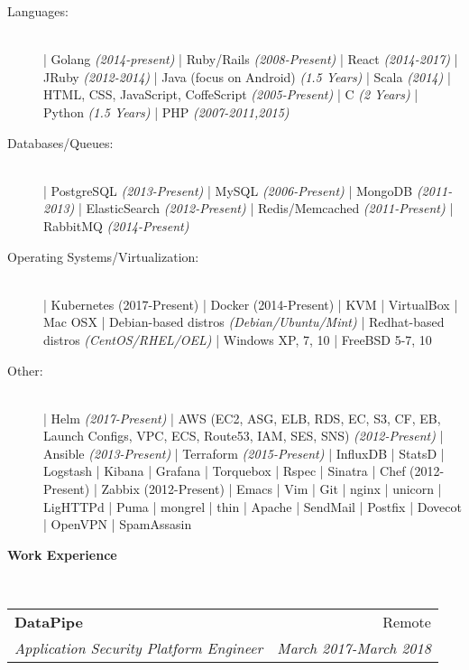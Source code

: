 \documentclass[a4paper,11pt,sans]{article}
\makeatletter
\newcommand{\resheading}[1]{{\large \colorbox{myblue}{\begin{minipage}{\textwidth}{\textbf{#1 \vphantom{p\^{E}}}}\end{minipage}}}}
\newcommand{\ressubheading}[4]{
\begin{tabular*}{7.0in}{l@{\extracolsep{\fill}}r}
		\textbf{#1} & #2 \\
		\textit{#3} & \textit{#4} \\
\end{tabular*}\vspace{-6pt}}
\makeatother
\begin{document}
\begin{description}
    \item[Languages:] \hfill \\
        | Golang \textit{(2014-present)}
        | Ruby/Rails \textit{(2008-Present)}
        | React \textit{(2014-2017)}
        | JRuby \textit{(2012-2014)}
        | Java (focus on Android) \textit{(1.5 Years)}
        | Scala \textit{(2014)}
        | HTML, CSS, JavaScript, CoffeScript \textit{(2005-Present)}
        | C \textit{(2 Years)}
        | Python \textit{(1.5 Years)}
        | PHP \textit{(2007-2011,2015)}
    \item[Databases/Queues:] \hfill  \\
        | PostgreSQL \textit{(2013-Present)}
        | MySQL \textit{(2006-Present)}
        | MongoDB \textit{(2011-2013)}
        | ElasticSearch \textit{(2012-Present)}
        | Redis/Memcached \textit{(2011-Present)}
        | RabbitMQ \textit{(2014-Present)}
    \item[Operating Systems/Virtualization:] \hfill \\
        | Kubernetes (2017-Present)
        | Docker (2014-Present)
        | KVM
        | VirtualBox
        | Mac OSX
        | Debian-based distros \textit{(Debian/Ubuntu/Mint)}
        | Redhat-based distros \textit{(CentOS/RHEL/OEL)}
        | Windows XP, 7, 10
        | FreeBSD 5-7, 10
    \item[Other:] \hfill \\
        | Helm \textit{(2017-Present)}  
        | AWS (EC2, ASG, ELB, RDS, EC, S3, CF, EB, Launch Configs, VPC, ECS, Route53, IAM, SES, SNS) \textit{(2012-Present)}
        | Ansible \textit{(2013-Present)}
        | Terraform \textit{(2015-Present)}
        | InfluxDB
        | StatsD
        | Logstash
        | Kibana
        | Grafana
        | Torquebox
        | Rspec
        | Sinatra
        | Chef (2012-Present)
        | Zabbix (2012-Present)
        | Emacs
        | Vim
        | Git
        | nginx
        | unicorn
        | LigHTTPd
        | Puma
        | mongrel
        | thin
        | Apache
        | SendMail
        | Postfix
        | Dovecot
        | OpenVPN
        | SpamAssasin

\end{description}

\resheading{\color{white} Work Experience}
\hspace{5pt} \\

\ressubheading{DataPipe}{Remote}{Application Security Platform Engineer}{March 2017-March 2018}
\end{document}
